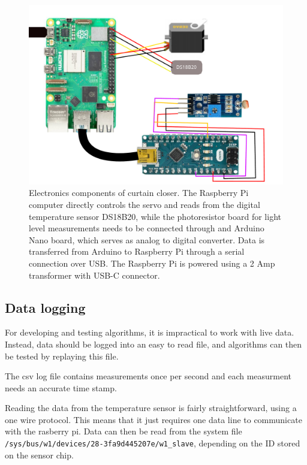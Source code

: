 \documentclass[a4paper,12pt]{article}
\begin{document}
\begin{figure}[h!]
    \includegraphics[width=\linewidth]{./figures/curtainCircuit.pdf}
    \caption{Electronics components of curtain closer. The Raspberry Pi computer directly controls the servo and reads from the digital temperature
    sensor DS18B20, while the photoresistor board for light level measurements needs to be connected through and Arduino Nano board, which serves as 
    analog to digital converter. Data is transferred from Arduino to Raspberry Pi through a serial connection over USB. The Raspberry Pi is powered
    using a 2 Amp transformer with USB-C connector.}
    \label{fig:plot1curtainCircuit}
  \end{figure}

\subsection{Data logging}

For developing and testing algorithms, it is impractical to work with live data. 
Instead, data should be logged into an easy to read file, and algorithms can then be tested by replaying this file.

The csv log file contains measurements once per second and each measurment needs an accurate time stamp.

Reading the data from the temperature sensor is fairly straightforward, using a one wire protocol\cite{url:digitalTempSensor}. 
This means that it just requires one data line to communicate with the rasberry pi.
Data can then be read from the system file \verb*|/sys/bus/w1/devices/28-3fa9d445207e/w1_slave|, depending on the ID stored on the sensor chip.
\end{document}

